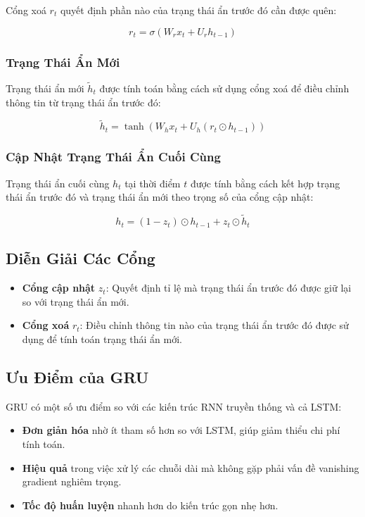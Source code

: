 Cổng xoá \( r_t \) quyết định phần nào của trạng thái ẩn trước đó cần được quên:

\[
r_t = \sigma(W_r x_t + U_r h_{t-1})
\]

\subsubsection{Trạng Thái Ẩn Mới}

Trạng thái ẩn mới \( \tilde{h}_t \) được tính toán bằng cách sử dụng cổng xoá để điều chỉnh thông tin từ trạng thái ẩn trước đó:

\[
\tilde{h}_t = \tanh(W_h x_t + U_h (r_t \odot h_{t-1}))
\]

\subsubsection{Cập Nhật Trạng Thái Ẩn Cuối Cùng}

Trạng thái ẩn cuối cùng \( h_t \) tại thời điểm \( t \) được tính bằng cách kết hợp trạng thái ẩn trước đó và trạng thái ẩn mới theo trọng số của cổng cập nhật:

\[
h_t = (1 - z_t) \odot h_{t-1} + z_t \odot \tilde{h}_t
\]

\subsection{Diễn Giải Các Cổng}

\begin{itemize}
    \item \textbf{Cổng cập nhật} \( z_t \): Quyết định tỉ lệ mà trạng thái ẩn trước đó được giữ lại so với trạng thái ẩn mới.
    \item \textbf{Cổng xoá} \( r_t \): Điều chỉnh thông tin nào của trạng thái ẩn trước đó được sử dụng để tính toán trạng thái ẩn mới.
\end{itemize}

\subsection{Ưu Điểm của GRU}

GRU có một số ưu điểm so với các kiến trúc RNN truyền thống và cả LSTM:

\begin{itemize}
    \item \textbf{Đơn giản hóa} nhờ ít tham số hơn so với LSTM, giúp giảm thiểu chi phí tính toán.
    \item \textbf{Hiệu quả} trong việc xử lý các chuỗi dài mà không gặp phải vấn đề vanishing gradient nghiêm trọng.
    \item \textbf{Tốc độ huấn luyện} nhanh hơn do kiến trúc gọn nhẹ hơn.
\end{itemize}


